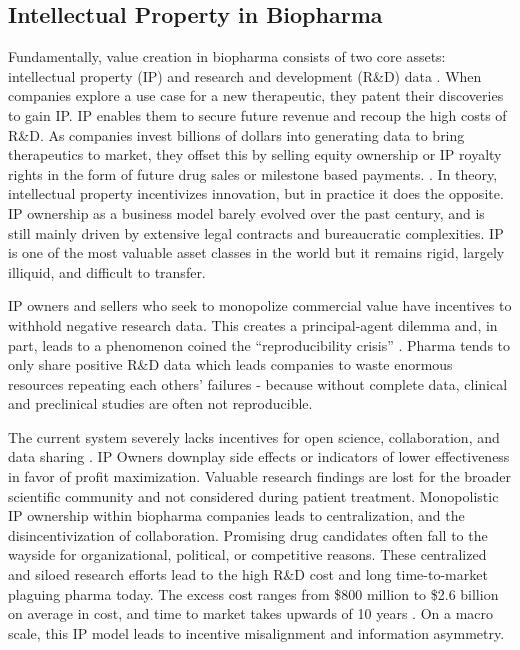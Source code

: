 \documentclass[10pt,letterpaper]{article}
\begin{document}
\subsection{Intellectual Property in Biopharma}
Fundamentally, value creation in biopharma consists of two core assets: intellectual property (IP) and research and development (R\&D) data \citep{Chandra2011}. When companies explore a use case for a new therapeutic, they patent their discoveries to gain IP. IP enables them to secure future revenue and recoup the high costs of R\&D. As companies invest billions of dollars into generating data to bring therapeutics to market, they offset this by selling equity ownership or IP royalty rights in the form of future drug sales or milestone based payments. \citep{Wouters2020}. In theory, intellectual property incentivizes innovation, but in practice it does the opposite. IP ownership as a business model barely evolved over the past century, and is still mainly driven by extensive legal contracts and bureaucratic complexities. IP is one of the most valuable asset classes in the world but it remains rigid, largely illiquid, and difficult to transfer. 

IP owners and sellers who seek to monopolize commercial value have incentives to withhold negative research data. This creates a principal-agent dilemma and, in part, leads to a phenomenon coined the “reproducibility crisis” \citep{Sherkow2017}. Pharma tends to only share positive R\&D data which leads companies to waste enormous resources repeating each others’ failures - because without complete data, clinical and preclinical studies are often not reproducible. 

The current system severely lacks incentives for open science, collaboration, and data sharing \citep{Ali-Khan2017}. IP Owners downplay side effects or indicators of lower effectiveness in favor of profit maximization. Valuable research findings are lost for the broader scientific community and not considered during patient treatment. Monopolistic IP ownership within biopharma companies leads to centralization, and the disincentivization of collaboration. Promising drug candidates often fall to the wayside for organizational, political, or competitive reasons. These centralized and siloed research efforts lead to the high R\&D cost and long time-to-market plaguing pharma today. The excess cost ranges from \$800 million to \$2.6 billion on average in cost, and time to market takes upwards of 10 years \citep{DiMasi2016}. On a macro scale, this IP model leads to incentive misalignment and information asymmetry. 
\end{document}
